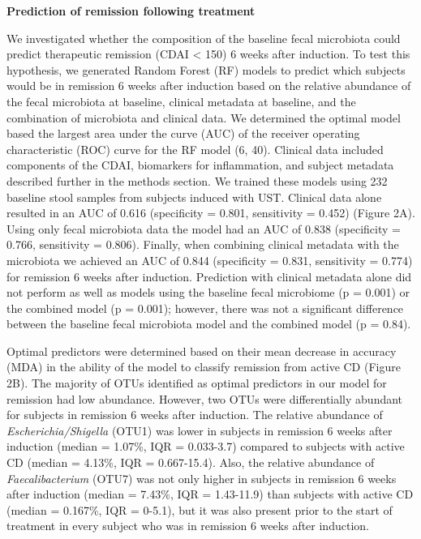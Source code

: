 \documentclass[12pt,]{article}
\begin{document}
\textbf{Prediction of remission following treatment}

We investigated whether the composition of the baseline fecal microbiota
could predict therapeutic remission (CDAI \textless{} 150) 6 weeks after
induction. To test this hypothesis, we generated Random Forest (RF)
models to predict which subjects would be in remission 6 weeks after
induction based on the relative abundance of the fecal microbiota at
baseline, clinical metadata at baseline, and the combination of
microbiota and clinical data. We determined the optimal model based the
largest area under the curve (AUC) of the receiver operating
characteristic (ROC) curve for the RF model (6, 40). Clinical data
included components of the CDAI, biomarkers for inflammation, and
subject metadata described further in the methods section. We trained
these models using 232 baseline stool samples from subjects induced with
UST. Clinical data alone resulted in an AUC of 0.616 (specificity =
0.801, sensitivity = 0.452) (Figure 2A). Using only fecal microbiota
data the model had an AUC of 0.838 (specificity = 0.766, sensitivity =
0.806). Finally, when combining clinical metadata with the microbiota we
achieved an AUC of 0.844 (specificity = 0.831, sensitivity = 0.774) for
remission 6 weeks after induction. Prediction with clinical metadata
alone did not perform as well as models using the baseline fecal
microbiome (p = 0.001) or the combined model (p = 0.001); however, there
was not a significant difference between the baseline fecal microbiota
model and the combined model (p = 0.84).

Optimal predictors were determined based on their mean decrease in
accuracy (MDA) in the ability of the model to classify remission from
active CD (Figure 2B). The majority of OTUs identified as optimal
predictors in our model for remission had low abundance. However, two
OTUs were differentially abundant for subjects in remission 6 weeks
after induction. The relative abundance of \emph{Escherichia/Shigella}
(OTU1) was lower in subjects in remission 6 weeks after induction
(median = 1.07\%, IQR = 0.033-3.7) compared to subjects with active CD
(median = 4.13\%, IQR = 0.667-15.4). Also, the relative abundance of
\emph{Faecalibacterium} (OTU7) was not only higher in subjects in
remission 6 weeks after induction (median = 7.43\%, IQR = 1.43-11.9)
than subjects with active CD (median = 0.167\%, IQR = 0-5.1), but it was
also present prior to the start of treatment in every subject who was in
remission 6 weeks after induction.
\end{document}
